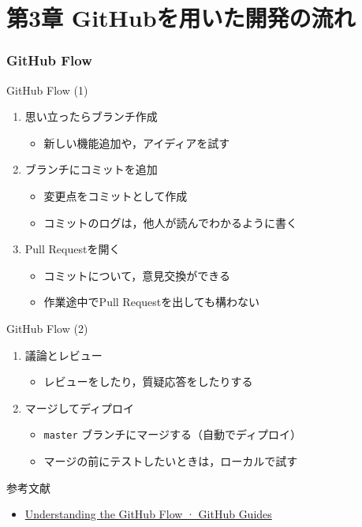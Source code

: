 \documentclass[t, aspectratio=169]{beamer}
\begin{document}
\part{第3章 GitHubを用いた開発の流れ}
\label{sec-3}
\section{GitHub Flow}
\label{sec-3-1}
\begin{frame}[label=sec-3-1-1]{GitHub Flow (1)}
\begin{enumerate}
\item 思い立ったらブランチ作成
\begin{itemize}
\item 新しい機能追加や，アイディアを試す
\end{itemize}
\item ブランチにコミットを追加
\begin{itemize}
\item 変更点をコミットとして作成
\item コミットのログは，他人が読んでわかるように書く
\end{itemize}
\item Pull Requestを開く
\begin{itemize}
\item コミットについて，意見交換ができる
\item 作業途中でPull Requestを出しても構わない
\end{itemize}
\end{enumerate}
\end{frame}

\begin{frame}[fragile,label=sec-3-1-2]{GitHub Flow (2)}
 \begin{enumerate}
\item 議論とレビュー
\begin{itemize}
\item レビューをしたり，質疑応答をしたりする
\end{itemize}
\item マージしてディプロイ
\begin{itemize}
\item \texttt{master} ブランチにマージする（自動でディプロイ）
\item マージの前にテストしたいときは，ローカルで試す
\end{itemize}
\end{enumerate}
参考文献
\begin{itemize}
\item \href{https://guides.github.com/introduction/flow/index.html}{Understanding the GitHub Flow · GitHub Guides}
\end{itemize}
\end{frame}
\end{document}
